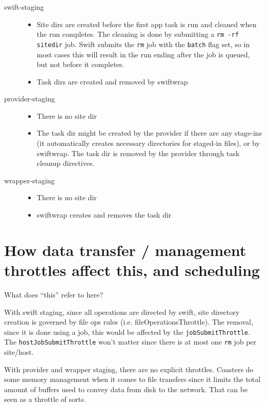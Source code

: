 \documentclass[12pt,letterpaper]{report}
\begin{document}
\begin{description}
	\item[swift-staging] 
		\begin{itemize}
			\item Site dirs are created before the first app task is run and cleaned when the run completes. The cleaning is done by submitting a \texttt{rm -rf sitedir} job. Swift submits the \texttt{rm} job with the \texttt{batch} flag set, so in most cases this will result in the run ending after the job is queued, but not before it completes.
			\item Task dirs are created and removed by swiftwrap
		\end{itemize}
	
	\item[provider-staging]
		\begin{itemize}
			\item There is no site dir
			\item The task dir might be created by the provider if there are any stage-ins (it automatically creates necessary directories for staged-in files), or by swiftwrap. The task dir is removed by the provider through task cleanup directives.
		\end{itemize}
	
	\item[wrapper-staging]
		\begin{itemize}
			\item There is no site dir
			\item swiftwrap creates and removes the task dir
		\end{itemize}
\end{description}

\section{How data transfer / management throttles affect this, and scheduling}

What does ``this'' refer to here?

With swift staging, since all operations are directed by swift, site directory creation is governed by file ops rules (i.e. fileOperationsThrottle). The removal, since it is done using a job, this would be affected by the \texttt{jobSubmitThrottle}. The \texttt{hostJobSubmitThrottle} won't matter since there is at most one \texttt{rm} job per site/host.

With provider and wrapper staging, there are no explicit throttles. Coasters do some memory management when it comes to file transfers since it limits the total amount of buffers used to convey data from disk to the network. That can be seen as a throttle of sorts.
\end{document}
